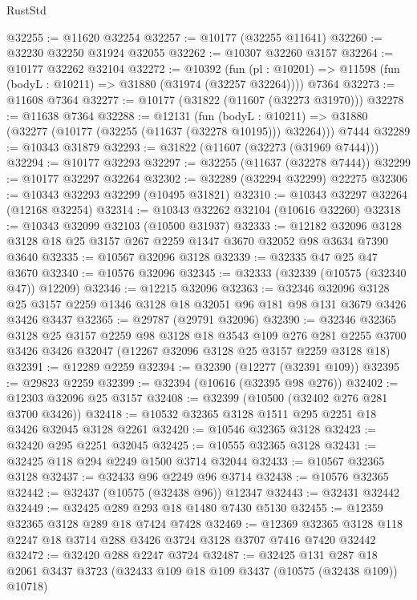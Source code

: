 \begin{lexlean}{RustStd}
\begin{coremodule}
@32255 := @11620 @32254
@32257 := @10177 (@32255 @11641)
@32260 := @32230 @32250 @31924 @32055
@32262 := @10307 @32260 @3157
@32264 := @10177 @32262 @32104
@32272 := @10392
    (fun (pl : @10201) => @11598 (fun (bodyL : @10211) => @31880 (@31974 (@32257 @32264))))
    @7364
@32273 := @11608 @7364
@32277 := @10177 (@31822 (@11607 (@32273 @31970)))
@32278 := @11638 @7364
@32288 := @12131
    (fun (bodyL : @10211) => @31880 (@32277 (@10177 (@32255 (@11637 (@32278 @10195))) @32264)))
    @7444
@32289 := @10343 @31879
@32293 := @31822 (@11607 (@32273 (@31969 @7444)))
@32294 := @10177 @32293
@32297 := @32255 (@11637 (@32278 @7444))
@32299 := @10177 @32297 @32264
@32302 := @32289 (@32294 @32299) @22275
@32306 := @10343 @32293 @32299 (@10495 @31821)
@32310 := @10343 @32297 @32264 (@12168 @32254)
@32314 := @10343 @32262 @32104 (@10616 @32260)
@32318 := @10343 @32099 @32103 (@10500 @31937)
@32333 := @12182
    @32096
    @3128
    @3128
    @18
    @25
    @3157
    @267
    @2259
    @1347
    @3670
    @32052
    @98
    @3634
    @7390
    @3640
@32335 := @10567 @32096 @3128
@32339 := @32335 @47 @25 @47 @3670
@32340 := @10576 @32096
@32345 := @32333 (@32339 (@10575 (@32340 @47)) @12209)
@32346 := @12215 @32096
@32363 := @32346
    @32096
    @3128
    @25
    @3157
    @2259
    @1346
    @3128
    @18
    @32051
    @96
    @181
    @98
    @131
    @3679
    @3426
    @3426
    @3437
@32365 := @29787 (@29791 @32096)
@32390 := @32346
    @32365
    @3128
    @25
    @3157
    @2259
    @98
    @3128
    @18
    @3543
    @109
    @276
    @281
    @2255
    @3700
    @3426
    @3426
    @32047
    (@12267 @32096 @3128 @25 @3157 @2259 @3128 @18)
@32391 := @12289 @2259
@32394 := @32390 (@12277 (@32391 @109))
@32395 := @29823 @2259
@32399 := @32394 (@10616 (@32395 @98 @276))
@32402 := @12303 @32096 @25 @3157
@32408 := @32399 (@10500 (@32402 @276 @281 @3700 @3426))
@32418 := @10532 @32365 @3128 @1511 @295 @2251 @18 @3426 @32045 @3128 @2261
@32420 := @10546 @32365 @3128
@32423 := @32420 @295 @2251 @32045
@32425 := @10555 @32365 @3128
@32431 := @32425 @118 @294 @2249 @1500 @3714 @32044
@32433 := @10567 @32365 @3128
@32437 := @32433 @96 @2249 @96 @3714
@32438 := @10576 @32365
@32442 := @32437 (@10575 (@32438 @96)) @12347
@32443 := @32431 @32442
@32449 := @32425 @289 @293 @18 @1480 @7430 @5130
@32455 := @12359 @32365 @3128 @289 @18 @7424 @7428
@32469 := @12369 @32365 @3128 @118 @2247 @18 @3714 @288 @3426 @3724 @3128 @3707 @7416 @7420 @32442
@32472 := @32420 @288 @2247 @3724
@32487 := @32425
    @131
    @287
    @18
    @2061
    @3437
    @3723
    (@32433 @109 @18 @109 @3437 (@10575 (@32438 @109)) @10718)

\end{coremodule}
\end{lexlean}
